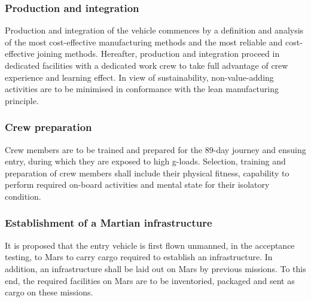 \subsubsection{Production and integration}
Production and integration of the vehicle commences by a definition and analysis of the most cost-effective manufacturing methods and the most reliable and cost-effective joining methods. Hereafter, production and integration proceed in dedicated facilities with a dedicated work crew to take full advantage of crew experience and learning effect. In view of sustainability, non-value-adding activities are to be minimised in conformance with the lean manufacturing principle. 

\subsubsection{Crew preparation}
Crew members are to be trained and prepared for the 89-day journey and ensuing entry, during which they are exposed to high g-loads. Selection, training and preparation of crew members shall include their physical fitness, capability to perform required on-board activities and mental state for their isolatory condition.

\subsubsection{Establishment of a Martian infrastructure}
It is proposed that the entry vehicle is first flown unmanned, in the acceptance testing, to Mars to carry cargo required to establish an infrastructure. In addition, an infrastructure shall be laid out on Mars by previous missions. To this end, the required facilities on Mars are to be inventoried, packaged and sent as cargo on these missions.



